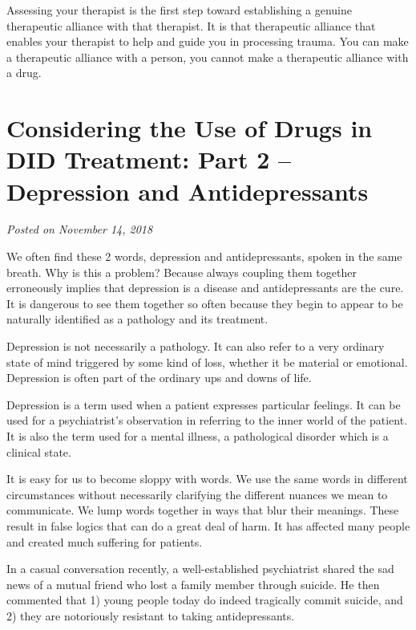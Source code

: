 \documentclass[]{book}
\begin{document}
Assessing your therapist is the first step toward establishing a genuine therapeutic alliance with that therapist. It is that therapeutic alliance that enables your therapist to help and guide you in processing trauma. You can make a therapeutic alliance with a person, you cannot make a therapeutic alliance with a drug.

\hypertarget{considering-the-use-of-drugs-in-did-treatment-part-2-depression-and-antidepressants}{%
\section{Considering the Use of Drugs in DID Treatment: Part 2 -- Depression and Antidepressants}\label{considering-the-use-of-drugs-in-did-treatment-part-2-depression-and-antidepressants}}

\emph{Posted on November 14, 2018}

We often find these 2 words, depression and antidepressants, spoken in the same breath. Why is this a problem? Because always coupling them together erroneously implies that depression is a disease and antidepressants are the cure. It is dangerous to see them together so often because they begin to appear to be naturally identified as a pathology and its treatment.

Depression is not necessarily a pathology. It can also refer to a very ordinary state of mind triggered by some kind of loss, whether it be material or emotional. Depression is often part of the ordinary ups and downs of life.

Depression is a term used when a patient expresses particular feelings. It can be used for a psychiatrist's observation in referring to the inner world of the patient. It is also the term used for a mental illness, a pathological disorder which is a clinical state.

It is easy for us to become sloppy with words. We use the same words in different circumstances without necessarily clarifying the different nuances we mean to communicate. We lump words together in ways that blur their meanings. These result in false logics that can do a great deal of harm. It has affected many people and created much suffering for patients.

In a casual conversation recently, a well-established psychiatrist shared the sad news of a mutual friend who lost a family member through suicide. He then commented that 1) young people today do indeed tragically commit suicide, and 2) they are notoriously resistant to taking antidepressants.
\end{document}
